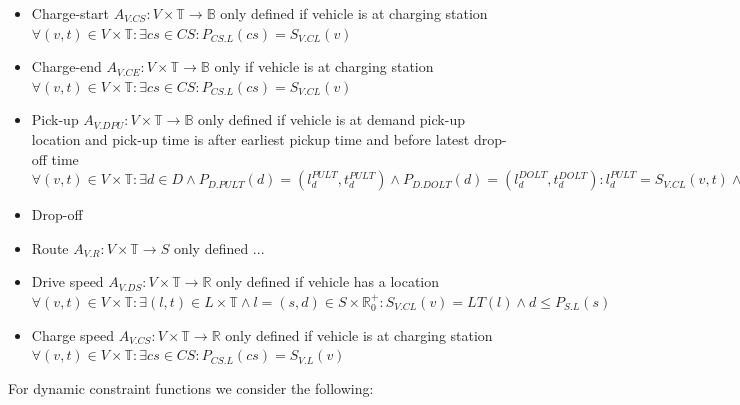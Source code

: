 \documentclass[graybox]{svmult}
\begin{document}
\begin{itemize}
	\item Charge-start $A_{V.CS}: V \times \mathbb{T} \rightarrow \mathbb{B}$ only defined if vehicle is at charging station $\forall (v,t) \in V \times \mathbb{T}: \exists cs \in CS: P_{CS.L}(cs) = S_{V.CL}(v)$
	\item Charge-end $A_{V.CE}: V \times \mathbb{T} \rightarrow \mathbb{B}$ only if vehicle is at charging station $\forall (v,t) \in V \times \mathbb{T}: \exists cs \in CS: P_{CS.L}(cs) = S_{V.CL}(v)$
	\item Pick-up $A_{V.DPU}: V \times \mathbb{T} \rightarrow \mathbb{B}$ only defined if vehicle is at demand pick-up location and pick-up time is after earliest pickup time and before latest drop-off time $\forall (v,t) \in V \times \mathbb{T}: \exists d \in D \wedge  P_{D.PULT}(d) = (l_d^{PULT},t_d^{PULT}) \wedge P_{D.DOLT}(d) = (l_d^{DOLT},t_d^{DOLT}): l_d^{PULT} = S_{V.CL}(v,t) \wedge t_d^{PULT} \leq t \leq t_d^{DOLT}$
	\item Drop-off
	\item Route $A_{V.R}: V \times \mathbb{T} \rightarrow S$ only defined ...
	\item Drive speed $A_{V.DS}: V \times \mathbb{T} \rightarrow \mathbb{R}$ only defined if vehicle has a location $\forall (v,t) \in V \times \mathbb{T}: \exists (l, t) \in L \times \mathbb{T} \wedge l = (s, d) \in S \times \mathbb{R}_0^+: S_{V.CL}(v) = LT(l) \wedge d \leq P_{S.L}(s)$
	

	
	\item Charge speed $A_{V.CS}: V \times \mathbb{T} \rightarrow \mathbb{R}$ only defined if vehicle is at charging station $\forall (v,t) \in V \times \mathbb{T}: \exists cs \in CS: P_{CS.L}(cs) = S_{V.L}(v)$
\end{itemize}
For dynamic constraint functions we consider the following:
\end{document}
